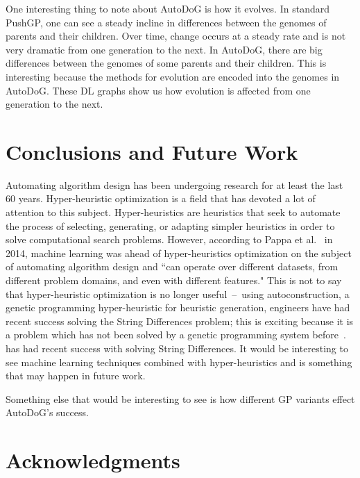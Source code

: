 \documentclass{sig-alternate}
\begin{document}

One interesting thing to note about AutoDoG is how it evolves. In standard PushGP, one can see a steady incline in differences between the genomes of parents and their children. Over time, change occurs at a steady rate and is not very dramatic from one generation to the next. In AutoDoG, there are big differences between the genomes of some parents and their children. This is interesting because the methods for evolution are encoded into the genomes in AutoDoG. These DL graphs  show us how evolution is affected from one generation to the next.
\section{Conclusions and Future Work}
\label{sec:conclusion}
Automating algorithm design has been undergoing research for at least the last 60 years. Hyper-heuristic optimization is a field that has devoted a lot of attention to this subject. Hyper-heuristics are heuristics that seek to automate the process of selecting, generating, or adapting simpler heuristics in order to solve computational search problems.
However, according to Pappa et al.~\cite{pappa:2014} in 2014, machine learning was ahead of hyper-heuristics optimization on the subject of automating algorithm design and ``can operate over different datasets, from different problem domains, and even with different features." This is not to say that hyper-heuristic optimization is no longer useful~--~using autoconstruction, a genetic programming hyper-heuristic for heuristic generation, engineers have had recent success solving the String Differences problem; this is exciting because it is a problem which has not been solved by a genetic programming system before~\cite{eva:2017}. has had recent success with solving String Differences. It would be interesting to see machine learning techniques combined with hyper-heuristics and is something that may happen in future work.

Something else that would be interesting to see is how different GP variants effect AutoDoG's success.

\section*{Acknowledgments}
\label{sec:acknowledgments}



  

\end{document}
